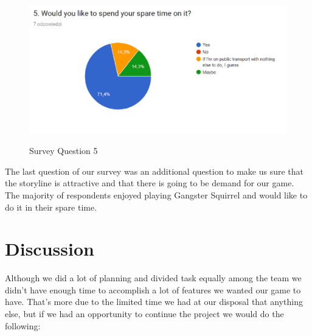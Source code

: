 \documentclass[12p]{article}
\begin{document}
\begin{figure}[H]
 \center
 \includegraphics[width=1\textwidth]{SurveyQuestions/5.png}
 \label{fig:survey_question_5}
 \caption{Survey Question 5}
\end{figure}

The last question of our survey was an additional question to make us sure that the storyline is attractive and that there is going to be demand for our game. The majority of respondents enjoyed playing Gangster Squirrel and would like to do it in their spare time. 


\newpage
\section{Discussion} \label{Discussion}

Although we did a lot of planning and divided task equally among the team we didn't have enough time to accomplish a lot of features we wanted our game to have. That's more due to the limited time we had at our disposal that anything else, but if we had an opportunity to continue the project we would do the following:
\end{document}
